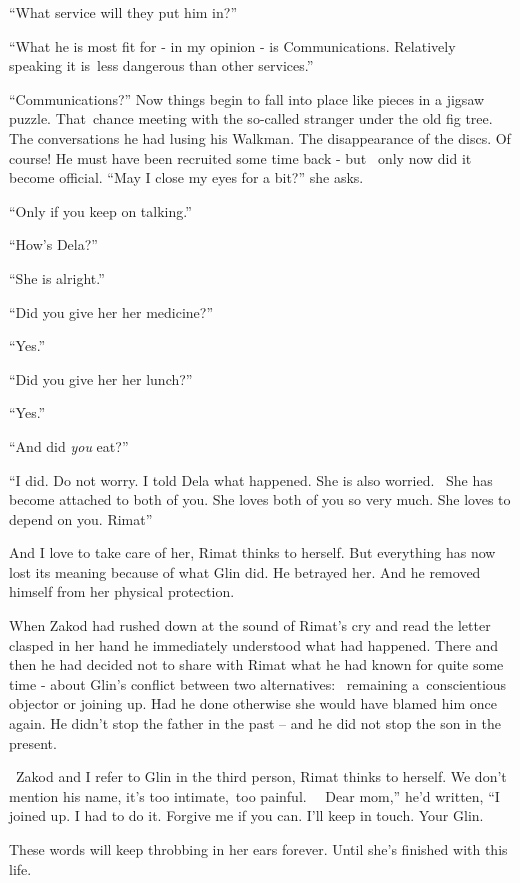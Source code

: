 \documentclass[letterpaper]{article}
\begin{document}
{}``What service will they put him in?''

{}``What he is most fit for - in my opinion - is Communications. Relatively speaking it is~less dangerous than other
services.''

{}``Communications?'' Now things begin to fall into place like pieces in a jigsaw puzzle. That~chance meeting with the
so-called stranger under the old fig tree. The conversations he had lusing his Walkman. The disappearance of the discs.
Of course! He must have been recruited some time back - but \ only now did it become official. ``May I close my eyes
for a bit?'' she asks. 

{}``Only if you keep on talking.'' 

{}``How's Dela?'' 

{}``She is alright.'' 

{}``Did you give her her medicine?'' 

{}``Yes.'' 

{}``Did you give her{ }her lunch?'' 

{}``Yes.'' 

{}``And did \textit{you} eat?'' 

{}``I did. Do not worry. I told Dela what happened. She is also worried.~ She has become attached to both of you. She
loves both of you so very much. She loves to depend on you. Rimat''

And I love to take care of her, Rimat thinks to herself. But everything has now lost its meaning because of what Glin
did. He betrayed her. And he removed himself from her physical protection.

When{ }Zakod had rushed down at the sound of Rimat's cry and read the letter clasped in her hand he
immediately understood what had happened. There and then he had decided{ }not to share with Rimat what
he had known for quite some time - about Glin's conflict between two alternatives: ~remaining a~conscientious objector
or joining up. Had he done otherwise she would have blamed him once again. He didn't stop the father in the past -- and
he did not stop the son in the present.

~Zakod and I refer to Glin in the third person, Rimat thinks to herself. We don't mention his name, it's too
intimate,~too painful. \ \ {\textquotedbl}Dear mom,'' he'd written, ``I joined up. I had to do it. Forgive me if you
can. I'll keep in touch. Your Glin.{\textquotedbl} 

These words will keep throbbing in her ears forever. Until she's finished with this life.
\end{document}
